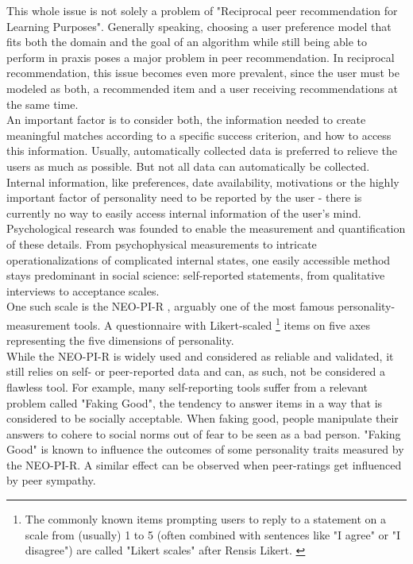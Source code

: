 \documentclass[conference]{IEEEtran}
\begin{document}
This whole issue is not solely a problem of "Reciprocal peer recommendation for Learning Purposes". Generally speaking, choosing a user preference model that fits both the domain and the goal of an algorithm while still being able to perform in praxis poses a major problem in peer recommendation. \cite{potts2018reciprocal, olakanmi2017group} In reciprocal recommendation, this issue becomes even more prevalent, since the user must be modeled as both, a recommended item and a user receiving recommendations at the same time.\\
An important factor is to consider both, the information needed to create meaningful matches according to a specific success criterion, and how to access this information. Usually, automatically collected data is preferred to relieve the users as much as possible. But not all data can automatically be collected. Internal information, like preferences, date availability, motivations or the highly important factor of personality need to be reported by the user - there is currently no way to easily access internal information of the user's mind.\\
Psychological research was founded to enable the measurement and quantification of these details. From psychophysical measurements to intricate operationalizations of complicated internal states, one easily accessible method stays predominant in social science: self-reported statements, from qualitative interviews to acceptance scales.\\
One such scale is the NEO-PI-R \cite{ostendorf2004neo}, arguably one of the most famous personality-measurement tools. A questionnaire with Likert-scaled \footnote{The commonly known items prompting users to reply to a statement on a scale from (usually) 1 to 5 (often combined with sentences like "I agree" or "I disagree") are called "Likert scales" after Rensis Likert. \cite{likert1932technique}} items on five axes representing the five dimensions of personality. \cite{mccrae1987validation, goldberg1990alternative}\\
While the NEO-PI-R is widely used and considered as reliable and validated, it still relies on self- or peer-reported data and can, as such, not be considered a flawless tool. For example, many self-reporting tools suffer from a relevant problem called "Faking Good", the tendency to answer items in a way that is considered to be socially acceptable. When faking good, people manipulate their answers to cohere to social norms out of fear to be seen as a bad person. "Faking Good" is known to influence the outcomes of some personality traits measured by the NEO-PI-R.\cite{griffin2004applicants} A similar effect can be observed when peer-ratings get influenced by peer sympathy. \cite{leising2010letter}\\
\end{document}
